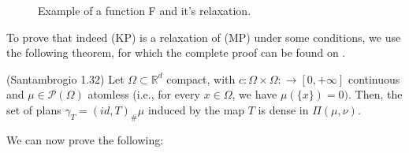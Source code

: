 \begin{figure}[H]
  \centering
  
  \caption{Example of a function F and it's relaxation.}
  \label{fig:relaxation_ex}
\end{figure}

To prove that indeed (KP) is a relaxation of (MP) under some conditions,
we use the following theorem, for which the complete proof can be found
on \citet{santambrogio2015optimal}.

\begin{theorem}(Santambrogio 1.32)
  Let $\Omega \subset \mathbb R^d$ compact, with
  $c:\Omega\times \Omega: \to [0,+\infty]$ continuous and
  $\mu \in \mathcal P(\Omega)$ atomless (i.e., for every
  $x \in \Omega$, we have $\mu(\{x\}) = 0)$.
  Then, the set of plans
  $\gamma_T = (id, T)_\# \mu$ induced by the map $T$ is dense in
  $\Pi(\mu,\nu)$.
  \label{thm:dense_mp}
\end{theorem}

We can now prove the following:

